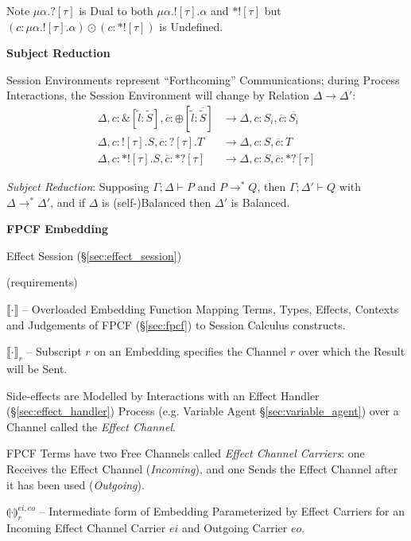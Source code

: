 \fist Note $\mu\alpha.?[\tau]$ is Dual to both
$\mu\alpha.![\tau].\alpha$ and $*![\tau]$ but
$(c:\mu\alpha.![\tau].\alpha) \odot (c:*![\tau])$ is Undefined.


\textbf{Subject Reduction}

Session Environments represent ``Forthcoming'' Communications; during
Process Interactions, the Session Environment will change by Relation
$\Delta \longrightarrow \Delta'$:
\begin{align*}
  \Delta, c:\&[\tilde{l}:\tilde{S}],
      \overline{c}:\oplus[\tilde{l}:\overline{\tilde{S}}]
    & \longrightarrow \Delta,c:S_i,\overline{c}:\overline{S_i} \\
  \Delta, c:![\tau].S, \overline{c}:?[\tau].T
    & \longrightarrow \Delta, c:S, \overline{c}:T \\
  \Delta, c:*![\tau].S, \overline{c}:*?[\tau]
    & \longrightarrow \Delta, c:S, \overline{c}:*?[\tau]
\end{align*}

\emph{Subject Reduction}: Supposing $\Gamma; \Delta \vdash P$ and $P
\rightarrow^* Q$, then $\Gamma; \Delta' \vdash Q$ with $\Delta
\longrightarrow^* \Delta'$, and if $\Delta$ is (self-)Balanced then
$\Delta'$ is Balanced.


\textbf{FPCF Embedding}

Effect Session (\S\ref{sec:effect_session})

(requirements) %

$\llbracket\cdot\rrbracket$ -- Overloaded Embedding Function Mapping
Terms, Types, Effects, Contexts and Judgements of FPCF
(\S\ref{sec:fpcf}) to Session Calculus constructs.

$\llbracket\cdot\rrbracket_r$ -- Subscript $r$ on an Embedding
specifies the Channel $r$ over which the Result will be Sent.

Side-effects are Modelled by Interactions with an Effect Handler
(\S\ref{sec:effect_handler}) Process (e.g. Variable Agent
\S\ref{sec:variable_agent}) over a Channel called the \emph{Effect
  Channel}.

FPCF Terms have two Free Channels called \emph{Effect Channel
  Carriers}: one Receives the Effect Channel (\emph{Incoming}), and
one Sends the Effect Channel after it has been used (\emph{Outgoing}).

$\llparenthesis\cdot\rrparenthesis_r^{ei,eo}$ -- Intermediate form of
Embedding Parameterized by Effect Carriers for an Incoming Effect
Channel Carrier $ei$ and Outgoing Carrier $eo$.

